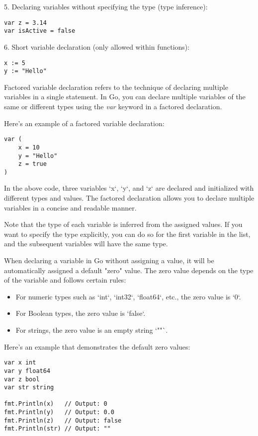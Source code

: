 5. Declaring variables without specifying the type (type inference):

\begin{lstlisting}[numbers=none]
var z = 3.14
var isActive = false
\end{lstlisting}


6. Short variable declaration (only allowed within functions):

\begin{lstlisting}[numbers=none]
x := 5
y := "Hello"
\end{lstlisting}

Factored variable declaration refers to the technique of declaring multiple
variables in a single statement. In Go, you can declare multiple variables of
the same or different types using the \textit{var} keyword in a factored
declaration.

Here's an example of a factored variable declaration:

\begin{lstlisting}[numbers=none]
var (
    x = 10
    y = "Hello"
    z = true
)
\end{lstlisting}

In the above code, three variables `x`, `y`, and `z` are declared and
initialized with different types and values. The factored declaration allows you
to declare multiple variables in a concise and readable manner.

Note that the type of each variable is inferred from the assigned values. If you
want to specify the type explicitly, you can do so for the first variable in the
list, and the subsequent variables will have the same type.

When declaring a variable in Go without assigning a value, it will be
automatically assigned a default "zero" value. The zero value depends on the
type of the variable and follows certain rules:

\begin{itemize}
\item For numeric types such as `int`, `int32`, `float64`, etc., the zero value is `0`.
\item For Boolean types, the zero value is `false`.
\item For strings, the zero value is an empty string `""`.
\end{itemize}

Here's an example that demonstrates the default zero values:

\begin{lstlisting}[numbers=none]
var x int
var y float64
var z bool
var str string

fmt.Println(x)   // Output: 0
fmt.Println(y)   // Output: 0.0
fmt.Println(z)   // Output: false
fmt.Println(str) // Output: ""
\end{lstlisting}

